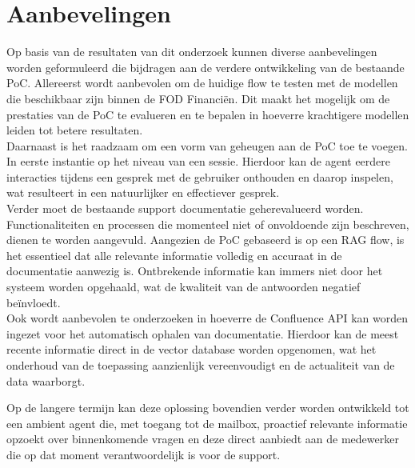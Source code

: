 
\chapter{Aanbevelingen}
\label{ch:aanbevelingen}

Op basis van de resultaten van dit onderzoek kunnen diverse aanbevelingen worden geformuleerd die bijdragen aan de verdere ontwikkeling van de bestaande PoC. Allereerst wordt aanbevolen om de huidige flow te testen met de modellen die beschikbaar zijn binnen de FOD Financiën. Dit maakt het mogelijk om de prestaties van de PoC te evalueren en te bepalen in hoeverre krachtigere modellen leiden tot betere resultaten.
\\[1em]
Daarnaast is het raadzaam om een vorm van geheugen aan de PoC toe te voegen. In eerste instantie op het niveau van een sessie. Hierdoor kan de agent eerdere interacties tijdens een gesprek met de gebruiker onthouden en daarop inspelen, wat resulteert in een natuurlijker en effectiever gesprek.
\\[1em]
Verder moet de bestaande support documentatie geherevalueerd worden. Functionaliteiten en processen die momenteel niet of onvoldoende zijn beschreven, dienen te worden aangevuld. Aangezien de PoC gebaseerd is op een RAG flow, is het essentieel dat alle relevante informatie volledig en accuraat in de documentatie aanwezig is. Ontbrekende informatie kan immers niet door het systeem worden opgehaald, wat de kwaliteit van de antwoorden negatief beïnvloedt.
\\[1em]
Ook wordt aanbevolen te onderzoeken in hoeverre de Confluence API kan worden ingezet voor het automatisch ophalen van documentatie. Hierdoor kan de meest recente informatie direct in de vector database worden opgenomen, wat het onderhoud van de toepassing aanzienlijk vereenvoudigt en de actualiteit van de data waarborgt.

Op de langere termijn kan deze oplossing bovendien verder worden ontwikkeld tot een ambient agent die, met toegang tot de mailbox, proactief relevante informatie opzoekt over binnenkomende vragen en deze direct aanbiedt aan de medewerker die op dat moment verantwoordelijk is voor de support.